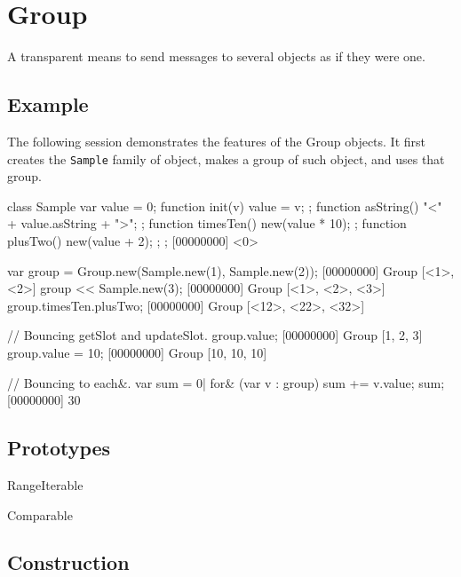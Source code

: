 
\section{Group}
A transparent means to send messages to several objects as if they
were one.

\subsection{Example}

The following session demonstrates the features of the Group
objects.  It first creates the \lstinline|Sample| family of object,
makes a group of such object, and uses that group.

\begin{urbiscript}[firstnumber=1]
class Sample
{
  var value = 0;
  function init(v)    { value = v; };
  function asString() { "<" + value.asString + ">"; };
  function timesTen() { new(value * 10); };
  function plusTwo()  { new(value + 2); };
};
[00000000] <0>

var group = Group.new(Sample.new(1), Sample.new(2));
[00000000] Group [<1>, <2>]
group << Sample.new(3);
[00000000] Group [<1>, <2>, <3>]
group.timesTen.plusTwo;
[00000000] Group [<12>, <22>, <32>]

// Bouncing getSlot and updateSlot.
group.value;
[00000000] Group [1, 2, 3]
group.value = 10;
[00000000] Group [10, 10, 10]

// Bouncing to each&.
var sum = 0|
for& (var v : group)
  sum += v.value;
sum;
[00000000] 30
\end{urbiscript}

\subsection{Prototypes}

\begin{refObjects}
\item[RangeIterable]
\item[Comparable]
\end{refObjects}

\subsection{Construction}

